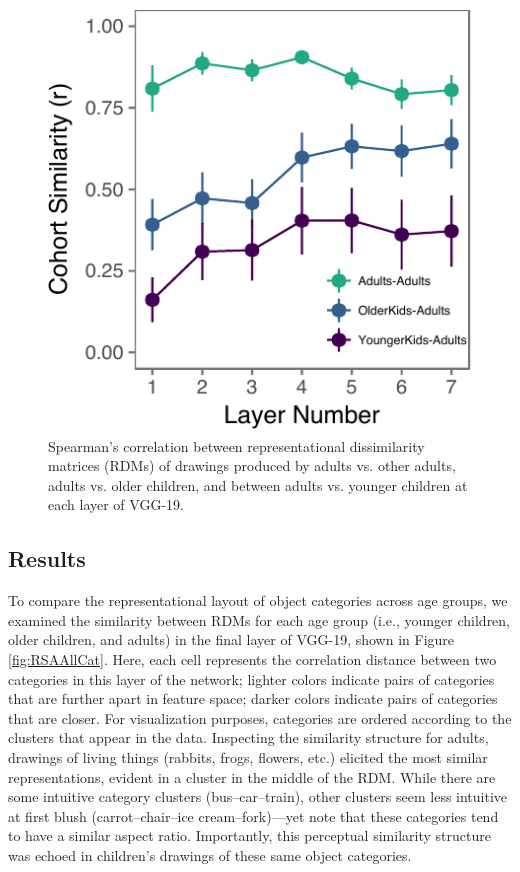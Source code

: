 \documentclass[10pt, letterpaper]{article}
\newenvironment{CodeChunk}{}{}
\begin{document}
\begin{CodeChunk}
\begin{figure}[t]

{\centering \includegraphics{figs/layerWise-1} 

}

\caption[Spearman's correlation between representational dissimilarity matrices (RDMs) of drawings produced by adults vs]{Spearman's correlation between representational dissimilarity matrices (RDMs) of drawings produced by adults vs. other adults, adults vs. older children, and between adults vs. younger children at each layer of VGG-19. }\label{fig:layerWise}
\end{figure}
\end{CodeChunk}

\subsection{Results}\label{results-1}

To compare the representational layout of object categories across age
groups, we examined the similarity between RDMs for each age group
(i.e., younger children, older children, and adults) in the final layer
of VGG-19, shown in Figure \ref{fig:RSAAllCat}. Here, each cell
represents the correlation distance between two categories in this layer
of the network; lighter colors indicate pairs of categories that are
further apart in feature space; darker colors indicate pairs of
categories that are closer. For visualization purposes, categories are
ordered according to the clusters that appear in the data. Inspecting
the similarity structure for adults, drawings of living things (rabbits,
frogs, flowers, etc.) elicited the most similar representations, evident
in a cluster in the middle of the RDM. While there are some intuitive
category clusters (bus--car--train), other clusters seem less intuitive
at first blush (carrot--chair--ice cream--fork)---yet note that these
categories tend to have a similar aspect ratio. Importantly, this
perceptual similarity structure was echoed in children's drawings of
these same object categories.
\end{document}
